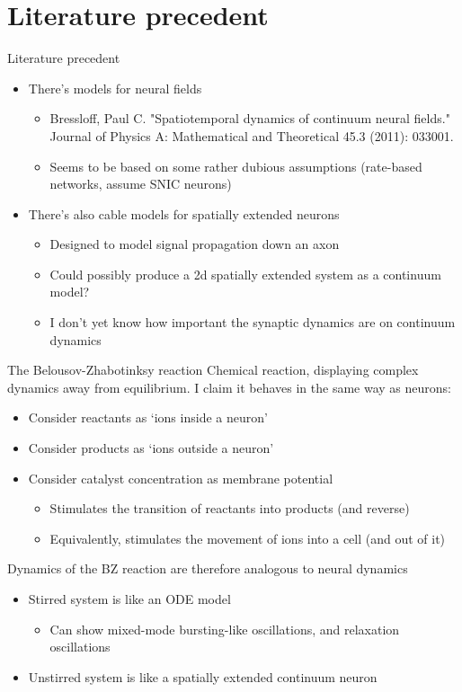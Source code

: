 \documentclass[presentation]{beamer}
\begin{document}
\section{Literature precedent}
\label{sec:org4743e52}
\begin{frame}[label={sec:org4ee95ba}]{Literature precedent}
\begin{itemize}
\item There's models for neural fields
\begin{itemize}
\item Bressloff, Paul C. "Spatiotemporal dynamics of continuum neural fields." Journal of Physics A: Mathematical and Theoretical 45.3 (2011): 033001.
\item Seems to be based on some rather dubious assumptions (rate-based networks, assume SNIC neurons)
\end{itemize}
\item There's also cable models for spatially extended neurons
\begin{itemize}
\item Designed to model signal propagation down an axon
\item Could possibly produce a 2d spatially extended system as a continuum model?
\item I don't yet know how important the synaptic dynamics are on continuum dynamics
\end{itemize}
\end{itemize}
\end{frame}
\begin{frame}[label={sec:org0bfc0ae}]{The Belousov-Zhabotinksy reaction}
Chemical reaction, displaying complex dynamics away from equilibrium.
I claim it behaves in the same way as neurons:
\begin{itemize}
\item Consider reactants as `ions inside a neuron'
\item Consider products as `ions outside a neuron'
\item Consider catalyst concentration as membrane potential
\begin{itemize}
\item Stimulates the transition of reactants into products (and reverse)
\item Equivalently, stimulates the movement of ions into a cell (and out of it)
\end{itemize}
\end{itemize}
Dynamics of the BZ reaction are therefore analogous to neural dynamics
\begin{itemize}
\item Stirred system is like an ODE model
\begin{itemize}
\item Can show mixed-mode bursting-like oscillations, and relaxation oscillations
\end{itemize}
\item Unstirred system is like a spatially extended continuum neuron
\end{itemize}
\end{frame}
\end{document}

